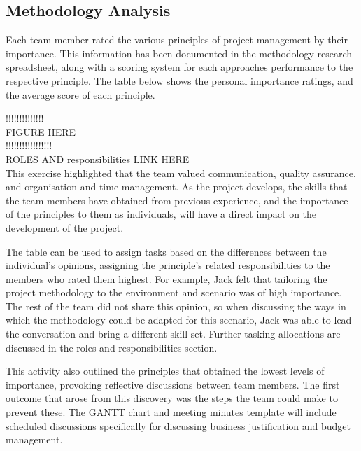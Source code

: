 \documentclass [12pt]{article}
\begin{document}
\subsection{Methodology Analysis}\label{sec:methodology_analysis}
Each team member rated the various principles of project management by their importance. This information has been documented in the methodology research spreadsheet, along with a scoring system for each approaches performance to the respective principle. The table below shows the personal importance ratings, and the average score of each principle.

!!!!!!!!!!!!!! \\
FIGURE HERE \\
!!!!!!!!!!!!!!!!! \\
ROLES AND responsibilities LINK HERE \\

This exercise highlighted that the team valued communication, quality assurance, and organisation and time management. As the project develops, the skills that the team members have obtained from previous experience, and the importance of the principles to them as individuals, will have a direct impact on the development of the project.

The table can be used to assign tasks based on the differences between the individual’s opinions, assigning the principle’s related responsibilities to the members who rated them highest. For example, Jack felt that tailoring the project methodology to the environment and scenario was of high importance. The rest of the team did not share this opinion, so when discussing the ways in which the methodology could be adapted for this scenario, Jack was able to lead the conversation and bring a different skill set. Further tasking allocations are discussed in the roles and responsibilities section.

This activity also outlined the principles that obtained the lowest levels of importance, provoking reflective discussions between team members. The first outcome that arose from this discovery was the steps the team could make to prevent these. The GANTT chart and meeting minutes template will include scheduled discussions specifically for discussing business justification and budget management.
\end{document}
